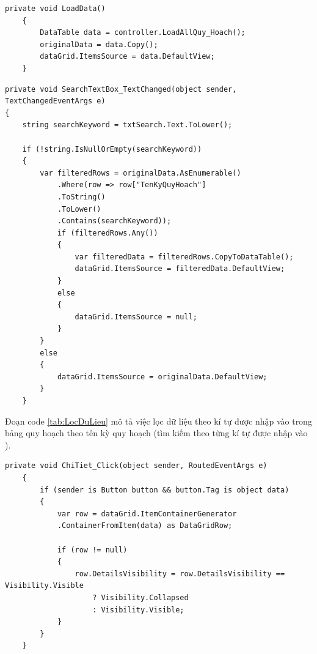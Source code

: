 \documentclass{article} %
\begin{document}
\begin{lstlisting}[caption={Hiển thị trên DataGrid}]   
    private void LoadData()
    {
        DataTable data = controller.LoadAllQuy_Hoach();
        originalData = data.Copy();
        dataGrid.ItemsSource = data.DefaultView;
    } 
\end{lstlisting}
\begin{lstlisting}[caption={Lọc dữ liệu}, label={tab:LocDuLieu}]   
private void SearchTextBox_TextChanged(object sender, TextChangedEventArgs e)
{
    string searchKeyword = txtSearch.Text.ToLower();
   
    if (!string.IsNullOrEmpty(searchKeyword))
    {
        var filteredRows = originalData.AsEnumerable()
            .Where(row => row["TenKyQuyHoach"]
            .ToString()
            .ToLower()
            .Contains(searchKeyword));
            if (filteredRows.Any())
            {
                var filteredData = filteredRows.CopyToDataTable();
                dataGrid.ItemsSource = filteredData.DefaultView;
            }
            else
            {
                dataGrid.ItemsSource = null;
            }
        }
        else
        {
            dataGrid.ItemsSource = originalData.DefaultView;
        }
    }
\end{lstlisting}
Đoạn code \ref{tab:LocDuLieu} mô tả việc lọc dữ liệu theo kí tự được nhập vào trong bảng quy hoạch theo tên kỳ quy hoạch (tìm kiếm theo từng kí tự được nhập vào ).

\begin{lstlisting}[caption={Hiển thị chi tiết thông tin theo hàng}]   
    private void ChiTiet_Click(object sender, RoutedEventArgs e)
    {
        if (sender is Button button && button.Tag is object data)
        {
            var row = dataGrid.ItemContainerGenerator
            .ContainerFromItem(data) as DataGridRow;
    
            if (row != null)
            {
                row.DetailsVisibility = row.DetailsVisibility == Visibility.Visible
                    ? Visibility.Collapsed
                    : Visibility.Visible;
            }
        }
    }
\end{lstlisting}
\end{document}
